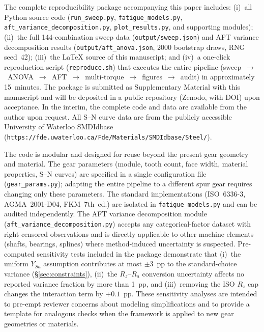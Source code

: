 \documentclass[12pt,a4paper]{article}
\begin{document}
The complete reproducibility package accompanying this paper includes:
(i)~all Python source code (\texttt{run\_sweep.py},
\texttt{fatigue\_models.py}, \texttt{aft\_variance\_decomposition.py},
\texttt{plot\_results.py}, and supporting modules);
(ii)~the full 144-combination sweep data
(\texttt{output/sweep.json}) and AFT variance decomposition results
(\texttt{output/aft\_anova.json}, 2000 bootstrap draws, RNG seed~42);
(iii)~the LaTeX source of this manuscript; and
(iv)~a one-click reproduction script (\texttt{reproduce.sh}) that
executes the entire pipeline (sweep~$\rightarrow$~ANOVA~$\rightarrow$~AFT~$\rightarrow$~multi-torque~$\rightarrow$~figures~$\rightarrow$~audit)
in approximately 15~minutes.
The package is submitted as Supplementary Material with this
manuscript and will be deposited in a public repository (Zenodo,
with DOI) upon acceptance. In the interim, the complete code and
data are available from the author upon request. All S--N curve data are from the
publicly accessible University of Waterloo SMDIdbase
(\texttt{https://fde.uwaterloo.ca/Fde/Materials/SMDIdbase/Steel/}).

The code is modular and designed for reuse beyond the present gear
geometry and material. The gear parameters (module, tooth count, face
width, material properties, S--N curves) are specified in a single
configuration file (\texttt{gear\_params.py}); adapting the entire
pipeline to a different spur gear requires changing only these
parameters. The standard implementations (ISO~6336-3, AGMA~2001-D04,
FKM~7th~ed.) are isolated in \texttt{fatigue\_models.py} and can be
audited independently. The AFT variance decomposition module
(\texttt{aft\_variance\_decomposition.py}) accepts any
categorical-factor dataset with right-censored observations and is
directly applicable to other machine elements (shafts, bearings,
splines) where method-induced uncertainty is suspected. Pre-computed
sensitivity tests included in the package demonstrate that (i)~the
uniform $Y_{Sa}$ assumption contributes at most $\pm$3~pp to the
standard-choice variance (\S\ref{sec:constraints}), (ii)~the
$R_z$--$R_a$ conversion uncertainty affects no reported variance
fraction by more than 1~pp, and (iii)~removing the ISO $R_z$ cap
changes the interaction term by $+0.1$~pp. These sensitivity analyses
are intended to pre-empt reviewer concerns about modeling
simplifications and to provide a template for analogous checks when
the framework is applied to new gear geometries or materials.
\end{document}
